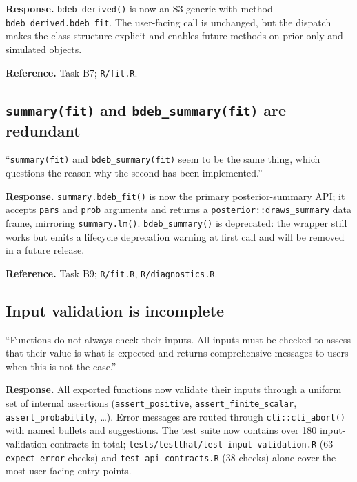 \documentclass[11pt,a4paper]{article}
\newcommand{\code}[1]{\texttt{#1}}
\newcommand{\pkg}[1]{\textsf{#1}}
\begin{document}
\textbf{Response.} \code{bdeb\_derived()} is now an S3 generic with
method \code{bdeb\_derived.bdeb\_fit}. The user-facing call is
unchanged, but the dispatch makes the class structure explicit and
enables future methods on prior-only and simulated objects.

\textbf{Reference.} Task B7; \code{R/fit.R}.

\subsection{\code{summary(fit)} and \code{bdeb\_summary(fit)} are
redundant}

\begin{displayquote}
``\verb|summary(fit)| and \verb|bdeb_summary(fit)| seem to be
the same thing, which questions the reason why the second has been
implemented.''
\end{displayquote}

\textbf{Response.} \code{summary.bdeb\_fit()} is now the primary
posterior-summary API; it accepts \code{pars} and \code{prob}
arguments and returns a \code{posterior::draws\_summary} data frame,
mirroring \code{summary.lm()}. \code{bdeb\_summary()} is deprecated:
the wrapper still works but emits a \pkg{lifecycle} deprecation
warning at first call and will be removed in a future release.

\textbf{Reference.} Task B9; \code{R/fit.R}, \code{R/diagnostics.R}.

\subsection{Input validation is incomplete}

\begin{displayquote}
``Functions do not always check their inputs. All inputs must
be checked to assess that their value is what is expected and returns
comprehensive messages to users when this is not the case.''
\end{displayquote}

\textbf{Response.} All exported functions now validate their inputs
through a uniform set of internal assertions
(\code{assert\_positive}, \code{assert\_finite\_scalar},
\code{assert\_probability}, \ldots). Error messages are routed
through \code{cli::cli\_abort()} with named bullets and suggestions.
The test suite now contains over 180 input-validation contracts in
total; \code{tests/testthat/test-input-validation.R} (63
\code{expect\_error} checks) and \code{test-api-contracts.R} (38
checks) alone cover the most user-facing entry points.
\end{document}
